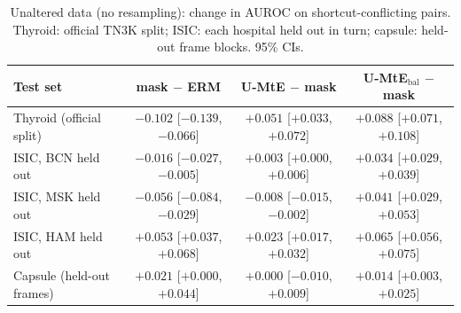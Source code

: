 \documentclass{article}
\begin{document}
\begin{table}[t]\centering\small
\caption{Unaltered data (no resampling): change in AUROC on shortcut-conflicting pairs. Thyroid: official TN3K split;
ISIC: each hospital held out in turn; capsule: held-out frame blocks. 95\% CIs.}\label{m:tab:natural}
\begin{tabular}{lccc}\toprule
Test set & mask $-$ ERM & U-MtE $-$ mask & U-MtE$_{\text{bal}}$ $-$ mask \\\midrule
Thyroid (official split) & $-0.102$ [$-0.139$, $-0.066$] & $+0.051$ [$+0.033$, $+0.072$] & $+0.088$ [$+0.071$, $+0.108$] \\
ISIC, BCN held out & $-0.016$ [$-0.027$, $-0.005$] & $+0.003$ [$+0.000$, $+0.006$] & $+0.034$ [$+0.029$, $+0.039$] \\
ISIC, MSK held out & $-0.056$ [$-0.084$, $-0.029$] & $-0.008$ [$-0.015$, $-0.002$] & $+0.041$ [$+0.029$, $+0.053$] \\
ISIC, HAM held out & $+0.053$ [$+0.037$, $+0.068$] & $+0.023$ [$+0.017$, $+0.032$] & $+0.065$ [$+0.056$, $+0.075$] \\
Capsule (held-out frames) & $+0.021$ [$+0.000$, $+0.044$] & $+0.000$ [$-0.010$, $+0.009$] & $+0.014$ [$+0.003$, $+0.025$] \\\bottomrule
\end{tabular}\end{table}
\end{document}
